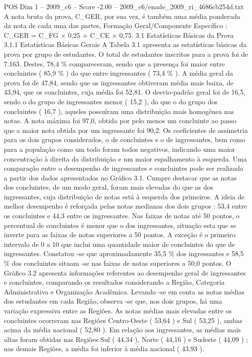 \begin{textsample}{POS Dim 1 – 2009\_c6 – Score -2.00 – 2009\_c6/enade\_2009\_ri\_4686cb254d.txt}
A nota bruta da prova, C\_GER, por sua vez, é também uma média ponderada da nota de cada uma das partes, Formação Geral/Componente Específico : C\_GER = C\_FG × 0,25 + C\_CE × 0,75. 3.1 Estatísticas Básicas da Prova 3.1.1 Estatísticas Básicas Gerais A Tabela 3.1 apresenta as estatísticas básicas da prova por grupo de estudantes.
O total de estudantes inscritos para a prova foi de 7.163.
Destes, 78,4 \% compareceram, sendo que a presença foi maior entre concluintes ( 85,9 \% ) do que entre ingressantes ( 73,4 \% ).
A média geral da prova foi de 47,84, sendo que os ingressantes obtiveram média mais baixa, de 43,94, que os concluintes, cuja média foi 52,81.
O desvio-padrão geral foi de 16,5, sendo o do grupo de ingressantes menor ( 15,2 ), do que o do grupo dos concluintes ( 16,7 ), aqueles possuíram uma distribuição mais homogênea nas notas.
A nota máxima foi 97,0, obtida por pelo menos um concluinte ao passo que a maior nota obtida por um ingressante foi 90,2.
Os coeficientes de assimetria para os dois grupos considerados, o de concluintes e o de ingressantes, bem como para a população como um todo foram todos negativos, indicando uma maior concentração à direita da distribuição e um maior espalhamento à esquerda.
Uma comparação entre o desempenho de ingressantes e concluintes pode ser realizada a partir dos dados apresentados no Gráfico 3.1.
Cumpre destacar que as notas dos concluintes, de um modo geral, foram mais elevadas do que as dos ingressantes, cuja distribuição de notas está à esquerda dos primeiros.
A ideia de melhor desempenho é reforçada pelas notas medianas dos dois grupos : 53,4 entre os concluintes e 44,3 entre os ingressantes.
Nas faixas de notas até 50 pontos, o percentual de concluintes é menor que o dos ingressantes, situação esta que se inverte para as faixas de notas superiores a 50 pontos.
A exceção é o primeiro intervalo de 0 a 10 que inclui uma quantidade maior de concluintes do que de ingressantes.
Constatou -se que aproximadamente 35,5 \% dos ingressantes e 58,5 \% dos concluintes situam -se nas faixas de notas superiores a 50,0 pontos.
O Gráfico 3.2 apresenta informações referentes ao desempenho geral de ingressantes e concluintes, comparando os resultados considerando a Região, Categoria Administrativa e Organização Acadêmica.
Levando -se em conta as notas médias dos estudantes em cada Região, observa -se que, nos dois grupos, há uma variação expressiva entre as Regiões.
As notas médias mais elevadas entre os concluintes ocorreram nas Regiões Centro-Oeste ( 53,64 ) e Sul ( 53,25 ), ambas acima da média nacional ( 52,80 ).
Em relação aos ingressantes, as médias mais altas foram obtidas nas Regiões Sul ( 44,34 ), Norte ( 44,16 ) e Sudeste ( 44,09 ) ; nas demais Regiões, a média foi inferior à média nacional ( 43,93 ).

\end{textsample}
